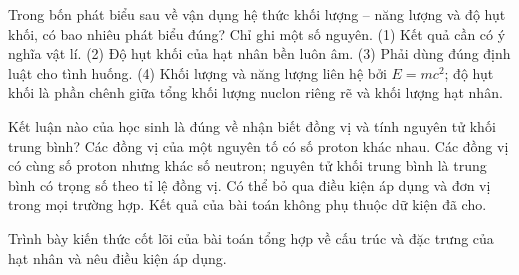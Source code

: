 \begin{ex}
Trong bốn phát biểu sau về vận dụng hệ thức khối lượng – năng lượng và độ hụt khối, có bao nhiêu phát biểu đúng? Chỉ ghi một số nguyên. (1) Kết quả cần có ý nghĩa vật lí. (2) Độ hụt khối của hạt nhân bền luôn âm. (3) Phải dùng đúng định luật cho tình huống. (4) Khối lượng và năng lượng liên hệ bởi $E=mc^2$; độ hụt khối là phần chênh giữa tổng khối lượng nuclon riêng rẽ và khối lượng hạt nhân.
\end{ex}

\begin{ex}
Kết luận nào của học sinh là đúng về nhận biết đồng vị và tính nguyên tử khối trung bình?
\choice
{Các đồng vị của một nguyên tố có số proton khác nhau.}
{\True Các đồng vị có cùng số proton nhưng khác số neutron; nguyên tử khối trung bình là trung bình có trọng số theo tỉ lệ đồng vị.}
{Có thể bỏ qua điều kiện áp dụng và đơn vị trong mọi trường hợp.}
{Kết quả của bài toán không phụ thuộc dữ kiện đã cho.}
\end{ex}

\begin{bt}
Trình bày kiến thức cốt lõi của bài toán tổng hợp về cấu trúc và đặc trưng của hạt nhân và nêu điều kiện áp dụng.
\end{bt}

